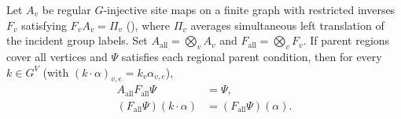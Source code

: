 \begin{lemma}%
    \label{thm:peps_regular_parent_reconstruction}
    \leanok
    Let $A_v$ be regular $G$-injective site maps on a finite graph with
    restricted inverses $F_v$ satisfying $F_vA_v=\Pi_v$
    (\cite[Definition~5.1]{Schuch2010PEPS}), where $\Pi_v$ averages
    simultaneous left translation of the incident group labels. Set
    $A_{\mathrm{all}}=\bigotimes_v A_v$ and
    $F_{\mathrm{all}}=\bigotimes_v F_v$.
    If parent regions cover all vertices and $\Psi$ satisfies each
    regional parent condition, then for every $k\in G^V$ (with
    $(k\cdot\alpha)_{v,e}=k_v\alpha_{v,e}$),
    \begin{align}
        A_{\mathrm{all}}F_{\mathrm{all}}\Psi & =\Psi,
        \label{eq:peps_regular_parent_reconstruction}                           \\
        (F_{\mathrm{all}}\Psi)(k\cdot\alpha)
                                             & =(F_{\mathrm{all}}\Psi)(\alpha).
        \label{eq:peps_regular_parent_left_invariance}
    \end{align}
\end{lemma}
